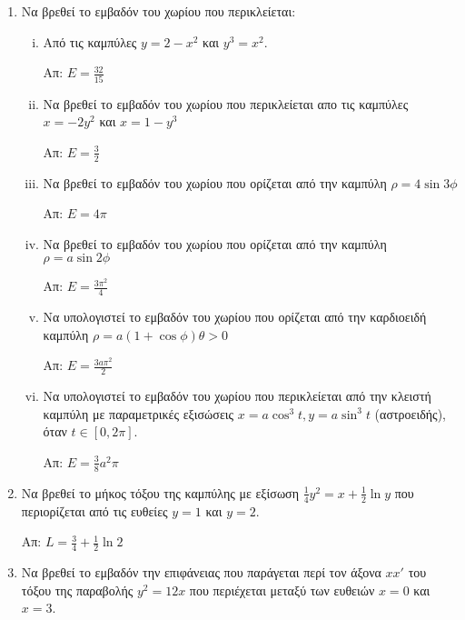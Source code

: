 \documentclass[a4paper,12pt]{article}
\begin{document}
\begin{center}
\end{center}

\vspace{2\baselineskip}

\begin{enumerate}


\item Να βρεθεί το εμβαδόν του χωρίου που περικλείεται:

\begin{enumerate}[i)]

\item Από τις καμπύλες $y=2-x^2$ και $y^3=x^2$.

\hfill Απ: $E=\frac{32}{15}$

\item Να βρεθεί το εμβαδόν του χωρίου που περικλείεται απο τις καμπύλες $x=-2y^2$ και $x=1-y^3$

\hfill Απ: $E=\frac{3}{2}$

\item Να βρεθεί το εμβαδόν του χωρίου που ορίζεται από την καμπύλη $\rho=4\sin 3\phi$

\hfill Απ: $E=4\pi$

\item Να βρεθεί το εμβαδόν του χωρίου που ορίζεται από την καμπύλη $\rho=a\sin 2\phi$

\hfill Απ: $E=\frac{3\pi^2}{4}$

\item Να υπολογιστεί το εμβαδόν του χωρίου που ορίζεται από την καρδιοειδή καμπύλη $\rho=a(1+\cos \phi) \theta >0$

\hfill Απ: $E=\frac{3a\pi^2}{2}$

\item Να υπολογιστεί το εμβαδόν του χωρίου που περικλείεται από την κλειστή καμπύλη με παραμετρικές εξισώσεις $x=a\cos^3t, y=a\sin^3t$ (αστροειδής), όταν $t\in [0,2\pi]$.

\hfill Απ: $E=\frac{3}{8}a^2\pi$
\end{enumerate}

\item Να βρεθεί το μήκος τόξου της καμπύλης με εξίσωση $\frac{1}{4}y^2=x+\frac{1}{2}\ln y$ που περιορίζεται από τις ευθείες $y=1$ και $y=2$.

\hfill Απ: $L=\frac{3}{4}+\frac{1}{2}\ln 2$

\item Να βρεθεί το εμβαδόν την επιφάνειας που παράγεται περί τον άξονα $xx'$ του τόξου της παραβολής $y^2=12x$ που περιέχεται μεταξύ των ευθειών $x=0$ και $x=3$.


\end{enumerate}
\end{document}
